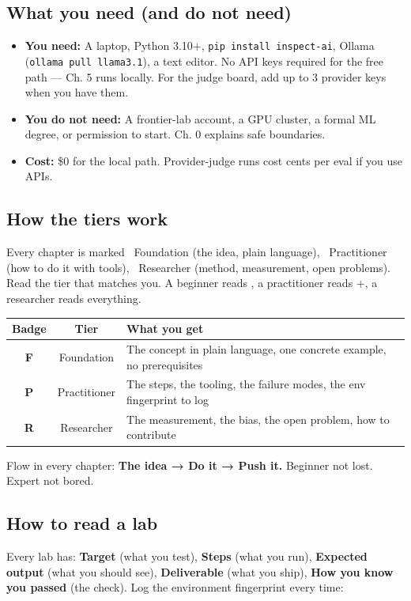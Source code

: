 \subsection*{What you need (and do not need)}
\begin{itemize}
\item \textbf{You need:} A laptop, Python 3.10+, \texttt{pip install inspect-ai}, Ollama (\texttt{ollama pull llama3.1}), a text editor. No API keys required for the free path — Ch. 5 runs locally. For the judge board, add up to 3 provider keys when you have them.
\item \textbf{You do not need:} A frontier-lab account, a GPU cluster, a formal ML degree, or permission to start. Ch. 0 explains safe boundaries.
\item \textbf{Cost:} \$0 for the local path. Provider-judge runs cost cents per eval if you use APIs.
\end{itemize}

\subsection*{How the tiers work}
Every chapter is marked \tierF\ Foundation (the idea, plain language), \tierP\ Practitioner (how to do it with tools), \tierR\ Researcher (method, measurement, open problems). Read the tier that matches you. A beginner reads \tierF, a practitioner reads \tierF+\tierP, a researcher reads everything.

\begin{center}
\begin{tabular}{ccl}
\toprule
Badge & Tier & What you get \\
\midrule
\colorbox{labgreen!15}{\textbf{F}} & Foundation & The concept in plain language, one concrete example, no prerequisites \\
\colorbox{pitamber!15}{\textbf{P}} & Practitioner & The steps, the tooling, the failure modes, the env fingerprint to log \\
\colorbox{accent!15}{\textbf{R}} & Researcher & The measurement, the bias, the open problem, how to contribute \\
\bottomrule
\end{tabular}
\end{center}

Flow in every chapter: \textbf{The idea → Do it → Push it.} Beginner not lost. Expert not bored.

\subsection*{How to read a lab}
Every lab has: \textbf{Target} (what you test), \textbf{Steps} (what you run), \textbf{Expected output} (what you should see), \textbf{Deliverable} (what you ship), \textbf{How you know you passed} (the check). Log the environment fingerprint every time:

